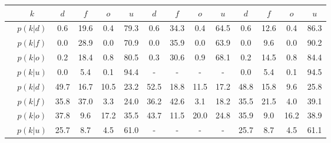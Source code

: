 \begin{center}
	\footnotesize
	\begin{tabular}{c|c|cccc|cccc|cccc}
		&$k$ & $d$ & $f$ & $o$ & $u$ & $d$ & $f$ & $o$ & $u$ & $d$ & $f$ & $o$ & $u$\\
		\hline
		\parbox[t]{2mm}{}&$p(k|d)$ & \textcolor{mygreen}{0.6} & \textcolor{myred}{19.6} & \textcolor{myred}{0.4} & 79.3 & \textcolor{mygreen}{0.6} & \textcolor{myred}{34.3} & \textcolor{myred}{0.4} & 64.5 & \textcolor{mygreen}{0.6} & \textcolor{myred}{12.6} & \textcolor{myred}{0.4} & 86.3\\
		&$p(k|f)$ & \textcolor{myred}{0.0} & \textcolor{mygreen}{28.9} & \textcolor{myred}{0.0} & 70.9 & \textcolor{myred}{0.0} & \textcolor{mygreen}{35.9} & \textcolor{myred}{0.0} & 63.9 & \textcolor{myred}{0.0} & \textcolor{mygreen}{9.6} & \textcolor{myred}{0.0} & 90.2\\
		&$p(k|o)$ & \textcolor{myred}{0.2} & \textcolor{myred}{18.4} & \textcolor{mygreen}{0.8} & 80.5 & \textcolor{myred}{0.3} & \textcolor{myred}{30.6} & \textcolor{mygreen}{0.9} & 68.1 & \textcolor{myred}{0.2} & \textcolor{myred}{14.5} & \textcolor{mygreen}{0.8} & 84.4\\
		&$p(k|u)$ & 0.0 & 5.4 & 0.1 & 94.4 & - & - & - & - & 0.0 & 5.4 & 0.1 & 94.5\\
		\hline
		\parbox[t]{2mm}{}&$p(k|d)$ & \textcolor{mygreen}{49.7} & \textcolor{myred}{16.7} & \textcolor{myred}{10.5} & 23.2 & \textcolor{mygreen}{52.5} & \textcolor{myred}{18.8} & \textcolor{myred}{11.5} & 17.2 & \textcolor{mygreen}{48.8} & \textcolor{myred}{15.8} & \textcolor{myred}{9.6} & 25.8\\
		&$p(k|f)$ & \textcolor{myred}{35.8} & \textcolor{mygreen}{37.0} & \textcolor{myred}{3.3} & 24.0 & \textcolor{myred}{36.2} & \textcolor{mygreen}{42.6} & \textcolor{myred}{3.1} & 18.2 & \textcolor{myred}{35.5} & \textcolor{mygreen}{21.5} & \textcolor{myred}{4.0} & 39.1\\
		&$p(k|o)$ & \textcolor{myred}{37.8} & \textcolor{myred}{9.6} & \textcolor{mygreen}{17.2} & 35.5 & \textcolor{myred}{43.7} & \textcolor{myred}{11.5} & \textcolor{mygreen}{20.0} & 24.8 & \textcolor{myred}{35.9} & \textcolor{myred}{9.0} & \textcolor{mygreen}{16.2} & 38.9\\
		&$p(k|u)$ & 25.7 & 8.7 & 4.5 & 61.0 & - & - & - & - & 25.7 & 8.7 & 4.5 & 61.1\\

\end{tabular}
\end{center}
